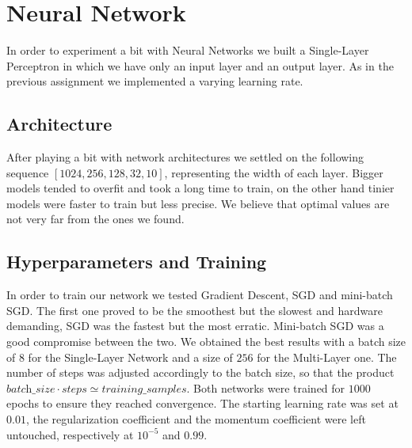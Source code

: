 \documentclass[10pt,a4paper]{report}
\begin{document}
\section{Neural Network}
In order to experiment a bit with Neural Networks we built a Single-Layer Perceptron in which we have only an input layer and an output layer. As in the previous assignment we implemented a varying learning rate.
\subsection{Architecture}
After playing a bit with network architectures we settled on the following sequence $[1024, 256, 128, 32, 10]$, representing the width of each layer. Bigger models tended to overfit and took a long time to train, on the other hand tinier models were faster to train but less precise. We believe that optimal values are not very far from the ones we found.
\subsection{Hyperparameters and Training}
In order to train our network we tested Gradient Descent, SGD and mini-batch SGD. The first one proved to be the smoothest but the slowest and hardware demanding, SGD was the fastest but the most erratic. Mini-batch SGD was a good compromise between the two. We obtained the best results with a batch size of $8$ for the Single-Layer Network and a size of $256$ for the Multi-Layer one. The number of steps was adjusted accordingly to the batch size, so that the product $\textit{batch\_size} \cdot \textit{steps} \simeq \textit{training\_samples}$. Both networks were trained for $1000$ epochs to ensure they reached convergence. The starting learning rate was set at $0.01$, the regularization coefficient and the momentum coefficient were left untouched, respectively at $10^{-5}$ and $0.99$. 
\end{document}
